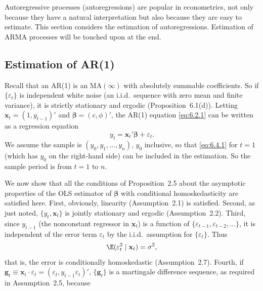 
Autoregressive processes (autoregressions) are popular in econometrics, not only
because they have a natural interpretation but also because they are easy to estimate.
This section considers the estimation of autoregressions. Estimation of
ARMA processes will be touched upon at the end.

\subsection*{Estimation of AR(1)}

Recall that an AR(1) is an $\text{MA}(\infty)$ with absolutely summable coefficients. So
if $\{\varepsilon_t\}$ is independent white noise (an i.i.d.\ sequence with zero mean and finite
variance), it is strictly stationary and ergodic (Proposition~6.1(d)). Letting $\mathbf{x}_t =
(1, y_{t-1})'$ and $\bm{\beta} = (c, \phi)'$, the AR(1) equation \eqref{eq:6.2.1} can be written as a regression
equation
\begin{equation}
  y_t = \mathbf{x}_t' \bm{\beta} + \varepsilon_t.
  \label{eq:6.4.1}
\end{equation}
We assume the sample is $(y_0, y_1, \ldots, y_n)$, $y_0$ inclusive, so that \eqref{eq:6.4.1} for $t = 1$
(which has $y_0$ on the right-hand side) can be included in the estimation. So the
sample period is from $t = 1$ to $n$.

We now show that all the conditions of Proposition~2.5 about the asymptotic
properties of the OLS estimator of $\bm{\beta}$ with conditional homoskedasticity are satisfied
here. First, obviously, linearity (Assumption~2.1) is satisfied. Second, as just
noted, $\{y_t, \mathbf{x}_t\}$ is jointly stationary and ergodic (Assumption~2.2). Third, since $y_{t-1}$
(the nonconstant regressor in $\mathbf{x}_t$) is a function of $\{\varepsilon_{t-1}, \varepsilon_{t-2}, \ldots\}$, it is independent
of the error term $\varepsilon_t$ by the i.i.d.\ assumption for $\{\varepsilon_t\}$. Thus
\begin{equation}
  \E(\varepsilon_t^2 \mid \mathbf{x}_t) = \sigma^2,
  \label{eq:6.4.2}
\end{equation}
that is, the error is conditionally homoskedastic (Assumption~2.7). Fourth, if
$\mathbf{g}_t \equiv \mathbf{x}_t \cdot \varepsilon_t = (\varepsilon_t, y_{t-1} \varepsilon_t)'$, $\{\mathbf{g}_t\}$ is a martingale difference sequence, as required in
Assumption~2.5, because

